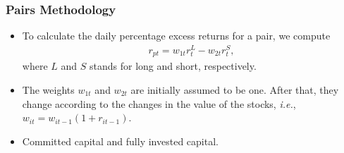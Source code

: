 \documentclass[pdf,9pt,xcolor=dvipsnames,hide notes]{beamer}
\begin{document}
\begin{frame}[label=frame3]
	\frametitle{Pairs Methodology}
	
	
	\begin{itemize}
		\justifying
		\item To calculate the daily percentage excess returns for a pair, we compute
		\begin{equation}
		\begin{aligned}
		r_{pt}=w_{1t}r_{t}^{L}-w_{2t}r_{t}^{S},
		\end{aligned}
		\label{eq:eq01}
		\end{equation}
		where $L$ and $S$ stands for long and short, respectively. 
		
		\vspace{0.3cm}
		
		
		\item The weights $w_{1t}$ and $w_{2t}$ are initially assumed to be one. After that, they change according to the changes in the value of the stocks, \emph{i.e.}, $w_{it}=w_{it-1}(1+r_{it-1})$.
		
		\vspace{0.3cm}
		
		\pause
		\item  Committed capital and fully invested capital. 
	
	\end{itemize}
	
\end{frame}
\end{document}
